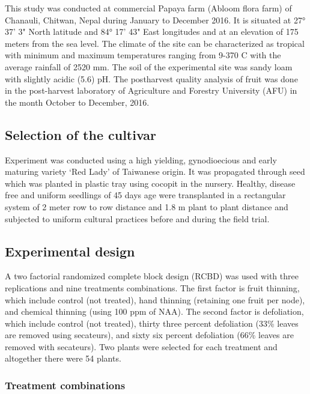 \documentclass[]{article}
\begin{document}
This study was conducted at commercial Papaya farm (Abloom flora farm)
of Chanauli, Chitwan, Nepal during January to December 2016. It is
situated at 27° 37' 3" North latitude and 84° 17' 43" East longitudes
and at an elevation of 175 meters from the sea level. The climate of the
site can be characterized as tropical with minimum and maximum
temperatures ranging from 9-370 C with the average rainfall of 2520 mm.
The soil of the experimental site was sandy loam with slightly acidic
(5.6) pH. The postharvest quality analysis of fruit was done in the
post-harvest laboratory of Agriculture and Forestry University (AFU) in
the month October to December, 2016.

\subsection{Selection of the cultivar}\label{selection-of-the-cultivar}

Experiment was conducted using a high yielding, gynodioecious and early
maturing variety `Red Lady' of Taiwanese origin. It was propagated
through seed which was planted in plastic tray using cocopit in the
nursery. Healthy, disease free and uniform seedlings of 45 days age were
transplanted in a rectangular system of 2 meter row to row distance and
1.8 m plant to plant distance and subjected to uniform cultural
practices before and during the field trial.

\subsection{Experimental design}\label{experimental-design}

A two factorial randomized complete block design (RCBD) was used with
three replications and nine treatments combinations. The first factor is
fruit thinning, which include control (not treated), hand thinning
(retaining one fruit per node), and chemical thinning (using 100 ppm of
NAA). The second factor is defoliation, which include control (not
treated), thirty three percent defoliation (33\% leaves are removed
using secateurs), and sixty six percent defoliation (66\% leaves are
removed with secateurs). Two plants were selected for each treatment and
altogether there were 54 plants.

\subsubsection{Treatment combinations}\label{treatment-combinations}
\end{document}
